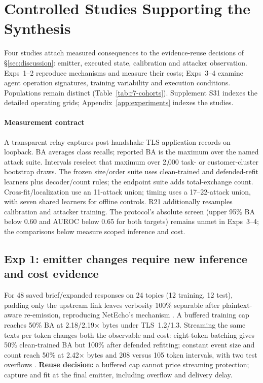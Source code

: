 \section{Controlled Studies Supporting the Synthesis}\label{sec:controlled-placement}\label{sec:tau-cover-bridge}
Four studies attach measured consequences to the evidence-reuse decisions of \S\ref{sec:discussion}: emitter, executed state, calibration and attacker observation. Exps~1--2 reproduce mechanisms and measure their costs; Exps~3--4 examine agent operation signatures, training variability and execution conditions. Populations remain distinct (Table~\ref{tab:r7-cohorts}). Supplement S31 indexes the detailed operating grids; Appendix~\ref{app:experiments} indexes the studies.

\paragraph{Measurement contract}
A transparent relay captures post-handshake TLS application records on loopback. BA averages class recalls; reported BA is the maximum over the named attack suite. Intervals reselect that maximum over 2,000 task- or customer-cluster bootstrap draws. The frozen size/order suite uses clean-trained and defended-refit learners plus decoder/count rules; the endpoint suite adds total-exchange count. Cross-fit/localization use an 11-attack union; timing uses a 17--22-attack union, with seven shared learners for offline controls. R21 additionally resamples calibration and attacker training. The protocol's absolute screen (upper 95\% BA below 0.60 and AUROC below 0.65 for both targets) remains unmet in Exps~3--4; the comparisons below measure scoped inference and cost.


\subsection{Exp 1: emitter changes require new inference and cost evidence}\label{sec:exp-emitter}
For 48 saved brief/expanded responses on 24 topics (12 training, 12 test), padding only the upstream link leaves verbosity 100\% separable after plaintext-aware re-emission, reproducing NetEcho's mechanism \cite{netecho2025}. A buffered training cap reaches 50\% BA at 2.18/2.19$\times$ bytes under TLS~1.2/1.3. Streaming the same texts per token changes both the observable and cost: eight-token batching gives 50\% clean-trained BA but 100\% after defended refitting; constant event size and count reach 50\% at 2.42$\times$ bytes and 208 versus 105 token intervals, with two test overflows \cite{weiss2024prompt,whisperleak2025}. \textbf{Reuse decision:} a buffered cap cannot price streaming protection; capture and fit at the final emitter, including overflow and delivery delay.

